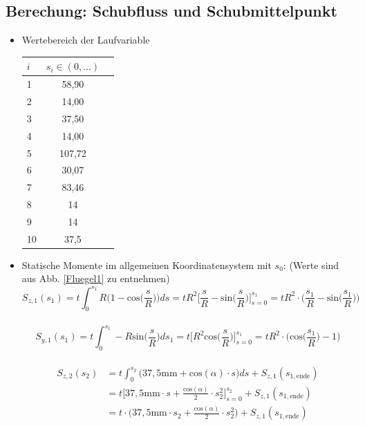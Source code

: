 \subsection{Berechung: Schubfluss und Schubmittelpunkt}\label{SchubRechnung}
\begin{itemize}
	\item Wertebereich der Laufvariable
	\begin{center}
		\begin{tabular}[h]{l|c|c}
			$i$&$s_i\in(0,...)$\\
			\hline
			1&58,90\\
			2&14,00\\
			3&37,50\\
			4&14,00\\
			5&107,72\\
			6&30,07\\
			7&83,46\\
			8&14\\
			9&14\\
			10&37,5\\
		\end{tabular}
	\end{center}
	\item Statische Momente im allgemeinen Koordinatensystem mit $s_0$: (Werte sind aus Abb. \ref{Fluegel1} zu entnehmen)
	\begin{equation}
		S_{z,1}(s_1) = t\int_{0}^{s_1} R\bigg(1-\mathrm{cos}\bigg(\frac{s}{R}\bigg)\bigg)ds = tR^2\bigg[\frac{s}{R} - \mathrm{sin}\bigg(\frac{s}{R}\bigg)\bigg]_{s=0}^{s_1} = tR^2\cdot\bigg(\frac{s_1}{R}-\mathrm{sin}\bigg(\frac{s_1}{R}\bigg)\bigg)
	\end{equation}\\
	\begin{equation}
		S_{y,1}(s_1) = t\int_{0}^{s_1} -R\mathrm{sin}\bigg(\frac{s}{R}\bigg)ds_1 = t\biggl[ R^2 \mathrm{cos}\bigg(\frac{s}{R}\bigg)\biggr]^{s_1}_{s=0} = tR^2 \cdot\bigg(\mathrm{cos}\bigg(\frac{s_1}{R}\bigg)-1\bigg)
	\end{equation}\\
\begin{equation}
	\begin{split}
		S_{z,2}(s_2) &= t\int_{0}^{s_2}\bigg(37,5\mathrm{mm}+\mathrm{cos}(\alpha)\cdot s\bigg)ds + S_{z,1}(s_{1,\mathrm{ende}}) \\\
		&= t\bigg[37,5\mathrm{mm}\cdot s +\frac{\mathrm{cos}(\alpha)}{2}\cdot s^2_2\bigg]_{s=0}^{s_2} + S_{z,1}(s_{1,\mathrm{ende}}) \\\ 
		&= t\cdot\bigg(37,5\mathrm{mm}\cdot s_2 +\frac{\mathrm{cos}(\alpha)}{2}\cdot s^2_2\bigg) + S_{z,1}(s_{1,\mathrm{ende}})

\end{split}
\end{equation}
\end{itemize}
